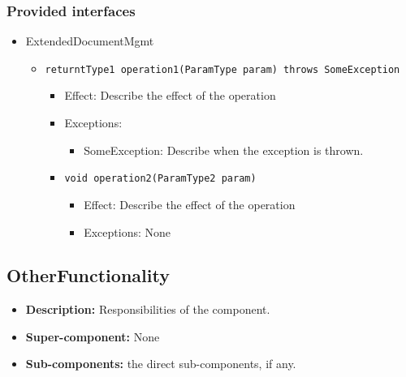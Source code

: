 \documentclass[a4paper,10pt]{article}
\begin{document}
\subsubsection*{Provided interfaces}
\begin{itemize}
    \item  ExtendedDocumentMgmt
    \begin{itemize}
        \item \texttt{returntType1 operation1(ParamType param) throws SomeException}
        \begin{itemize}
            \item Effect: Describe the effect of the operation
            \item Exceptions:
            \begin{itemize}
                \item SomeException: Describe when the exception is thrown.
            \end{itemize}

            \item \texttt{void operation2(ParamType2 param)}
            \begin{itemize}
                \item Effect: Describe the effect of the operation
                \item Exceptions: None
            \end{itemize}
        \end{itemize}
    \end{itemize}
\end{itemize}

\subsection{OtherFunctionality}
\begin{itemize}
    \item \textbf{Description:} Responsibilities of the component.
    \item \textbf{Super-component:} None
    \item \textbf{Sub-components:} the direct sub-components, if any.
\end{itemize}
\end{document}
